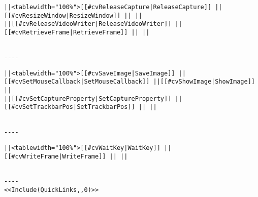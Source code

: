 \begin{verbatim}
||<tablewidth="100%">[[#cvReleaseCapture|ReleaseCapture]] ||[[#cvResizeWindow|ResizeWindow]] || ||
||[[#cvReleaseVideoWriter|ReleaseVideoWriter]] ||[[#cvRetrieveFrame|RetrieveFrame]] || ||


----

\end{verbatim}
\begin{verbatim}
||<tablewidth="100%">[[#cvSaveImage|SaveImage]] ||[[#cvSetMouseCallback|SetMouseCallback]] ||[[#cvShowImage|ShowImage]] ||
||[[#cvSetCaptureProperty|SetCaptureProperty]] ||[[#cvSetTrackbarPos|SetTrackbarPos]] || ||


----

\end{verbatim}
\begin{verbatim}
||<tablewidth="100%">[[#cvWaitKey|WaitKey]] ||[[#cvWriteFrame|WriteFrame]] || ||


----
<<Include(QuickLinks,,0)>>
\end{verbatim}
